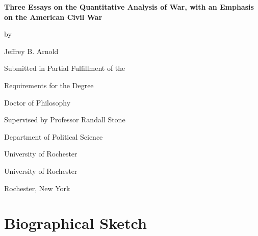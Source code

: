 \documentclass[12pt]{memoir}
\begin{document}
\begin{titlingpage}
  \vspace*{\fill}

  \begin{center}
    {\LARGE \bfseries
      Three Essays on the Quantitative Analysis of War,
      with an Emphasis on the American Civil War
      \par
    }

    \bigskip%
    by

    \bigskip%
    Jeffrey B. Arnold


    \bigskip\bigskip\bigskip\bigskip%
    Submitted in Partial Fulfillment of the

    \bigskip%
    Requirements for the Degree

    \bigskip%
    Doctor of Philosophy


    \bigskip\bigskip\bigskip\bigskip%
    Supervised by Professor Randall Stone

    \bigskip\bigskip%
    Department of Political Science

    \bigskip%
    University of Rochester


    \bigskip\bigskip\bigskip\bigskip%
    University of Rochester

    \bigskip%
    Rochester, New York


    \bigskip\bigskip\bigskip{}
  \end{center}

  \vspace*{\fill}
\end{titlingpage}

\setcounter{page}{2}

\DoubleSpacing

\begin{center}
  \vspace*{\fill}
  \itshape%
  
  \vspace*{\fill}
\end{center}

\clearpage


\chapter*{Biographical Sketch}

\end{document}
